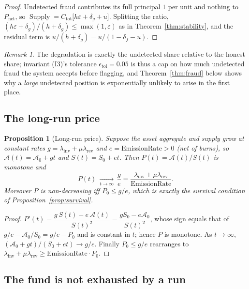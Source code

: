 \documentclass[11pt]{article}
\theoremstyle{plain}
\newtheorem{proposition}{Proposition}
\theoremstyle{definition}
\theoremstyle{remark}
\newtheorem{remark}{Remark}
\newcommand{\Supply}{\operatorname{Supply}}
\begin{document}
\begin{proof}
Undetected fraud contributes its full principal $1$ per unit and nothing to $P_{\mathrm{net}}$, so $\Supply=C_{\mathrm{tot}}\bigl[h\varepsilon+\delta_g+u\bigr]$. Splitting the ratio, $(h\varepsilon+\delta_g)/(h+\delta_g)\le\max(1,\varepsilon)$ as in Theorem~\ref{thm:stability}, and the residual term is $u/(h+\delta_g)=u/(1-\delta_f-u)$.
\end{proof}

\begin{remark}
The degradation is exactly the undetected share relative to the honest share; invariant (I3)'s tolerance $\epsilon_{\mathrm{tol}}=0.05$ is thus a cap on how much undetected fraud the system accepts before flagging, and Theorem~\ref{thm:fraud} below shows why a \emph{large} undetected position is exponentially unlikely to arise in the first place.
\end{remark}

\subsection{The long-run price}

\begin{proposition}[Long-run price]\label{prop:longrun}
Suppose the asset aggregate and supply grow at constant rates $g=\lambda_{\mathrm{inv}}+\mu\lambda_{\mathrm{rev}}$ and $e=\mathrm{EmissionRate}>0$ (net of burns), so $\mathcal{A}(t)=\mathcal{A}_0+gt$ and $S(t)=S_0+et$. Then $P(t)=\mathcal{A}(t)/S(t)$ is monotone and
\[
P(t)\ \xrightarrow[t\to\infty]{}\ \frac{g}{e}=\frac{\lambda_{\mathrm{inv}}+\mu\lambda_{\mathrm{rev}}}{\mathrm{EmissionRate}} .
\]
Moreover $P$ is non-decreasing iff $P_0\le g/e$, which is exactly the survival condition of Proposition~\ref{prop:survival}.
\end{proposition}

\begin{proof}
$P'(t)=\dfrac{g\,S(t)-e\,\mathcal{A}(t)}{S(t)^2}=\dfrac{gS_0-e\mathcal{A}_0}{S(t)^2}$, whose sign equals that of $g/e-\mathcal{A}_0/S_0=g/e-P_0$ and is constant in $t$; hence $P$ is monotone. As $t\to\infty$, $(\mathcal{A}_0+gt)/(S_0+et)\to g/e$. Finally $P_0\le g/e$ rearranges to $\lambda_{\mathrm{inv}}+\mu\lambda_{\mathrm{rev}}\ge\mathrm{EmissionRate}\cdot P_0$.
\end{proof}

\subsection{The fund is not exhausted by a run}
\end{document}
